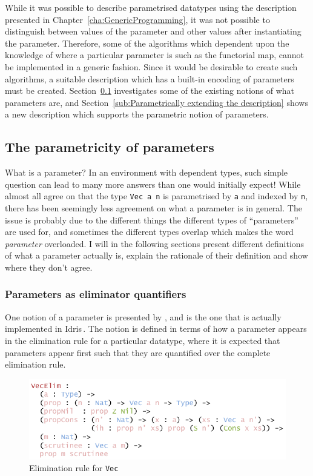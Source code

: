 \documentclass{ituthesis}
\newcommand{\tttype}[1]{\textcolor{type-color}{\texttt{#1}}}
\newcommand{\ttvar}[1]{\textcolor{local-var-color}{\texttt{#1}}}
\theoremstyle{break}
\begin{document}
While it was possible to describe parametrised datatypes using the description presented in Chapter~\ref{cha:GenericProgramming}, it was not possible to distinguish
between values of the parameter and other values after instantiating the parameter.
Therefore, some of the algorithms which dependent upon the knowledge of where a particular parameter is such as the functorial map,
cannot be implemented in a generic fashion.
Since it would be desirable to create such algorithms, a suitable description which has a built-in encoding of parameters must be created.
Section~\ref{sub:The parametricity of parameters} investigates some of the existing notions of what parameters are, and Section~\ref{sub:Parametrically extending the description} shows a new description which supports
the parametric notion of parameters.

\subsection{The parametricity of parameters}
\label{sub:The parametricity of parameters}
What is a parameter?
In an environment with dependent types, such simple question can lead to many more answers than one would initially expect!
While almost all agree on that the type \tttype{Vec}~\ttvar{a}~\ttvar{n} is parametrised by \ttvar{a} and indexed by \ttvar{n}, there has been seemingly less agreement on what a parameter is in general.
The issue is probably due to the different things the different types of ``parameters'' are used for, and sometimes the different types overlap which makes the word \textit{parameter} overloaded.
I will in the following sections present different definitions of what a parameter actually is, explain the rationale of their definition and show where they don't agree.

\subsubsection{Parameters as eliminator quantifiers}
\label{ssub:Parameters as eliminator quantifiers}
One notion of a parameter is presented by \textcite{Dybjer97inductivefamilies}, and is the one that is actually implemented in Idris\,\autocite{brady2013idris}.
The notion is defined in terms of how a parameter appears in the elimination rule for a particular datatype, where it is expected that parameters appear first such that they are quantified over the complete elimination rule.

\begin{figure}[ht]
\begin{center}
    \includegraphics[scale=0.5]{Figures/VectorElim.png}
\end{center}
\caption{Elimination rule for \tttype{Vec}}
\label{fig:vecelim}
\end{figure}
\end{document}

